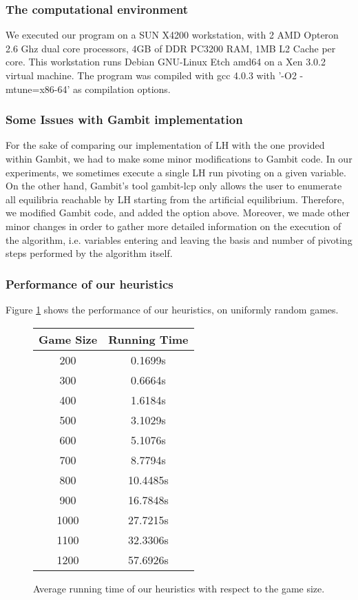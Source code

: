 \documentclass[11pt]{article}
\begin{document}
\subsubsection{The computational environment}

We executed our program on a SUN X4200 workstation, with 2 AMD
Opteron 2.6 Ghz dual core processors, 4GB of DDR PC3200 RAM, 1MB L2
Cache per core. This workstation runs Debian GNU-Linux Etch amd64 on
a Xen 3.0.2 virtual machine. The program was compiled with gcc 4.0.3
with '-O2 -mtune=x86-64' as compilation options.

\subsubsection{Some Issues with Gambit implementation}
\label{gambit_impl}

For the sake of comparing our implementation of LH with the one
provided within Gambit, we had to make some minor modifications to
Gambit code. In our experiments, we sometimes execute a single LH
run pivoting on a given variable. On the other hand, Gambit's tool
gambit-lcp only allows the user to enumerate all equilibria
reachable by LH starting from the artificial equilibrium. Therefore,
we modified Gambit code, and added the option above. Moreover, we
made other minor changes in order to gather more detailed
information on the execution of the algorithm, i.e. variables
entering and leaving the basis and number of pivoting steps
performed by the algorithm itself.

\subsubsection{Performance of our heuristics}

Figure \ref{tabheu} shows the performance of our heuristics, on uniformly random games. 

\begin{figure}[h]
\centering
\begin{tabular}{|c|c|}
\hline
\textbf{Game Size} & \textbf{Running Time} \\
\hline
200 & 0.1699s\\
300&0.6664s\\
400&1.6184s\\
500&3.1029s\\
600&5.1076s\\
700&8.7794s\\
800&10.4485s\\
900&16.7848s\\
1000&27.7215s\\
1100&32.3306s\\
1200&57.6926s\\
\hline
\end{tabular}
\caption{Average running time of our heuristics with respect to the game size.}
\label{tabheu}
\end{figure}
\end{document}
